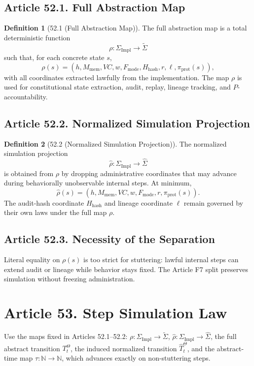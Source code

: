 \documentclass[10pt,oneside]{article}
\theoremstyle{definition}
\newtheorem*{definition}{Definition}
\theoremstyle{remark}
\newcommand{\N}{\mathbb{N}}
\newcommand{\Impl}{\mathrm{Impl}}
\newcommand{\prot}{\mathrm{prot}}
\newcommand{\mem}{\mathrm{mem}}
\newcommand{\hash}{\mathrm{hash}}
\newcommand{\mode}{\mathrm{mode}}
\begin{document}
\subsection{Article 52.1. Full Abstraction Map}
\begin{definition}[52.1 (Full Abstraction Map)]
The full abstraction map is a total deterministic function
\[
\rho:\Sigma_{\Impl}\to\widetilde{\Sigma}
\]
such that, for each concrete state \(s\),
\[
\rho(s)=(h,M_{\mem},VC,w,F_{\mode},H_{\hash},r,\ell,\pi_{\prot}(s)),
\]
with all coordinates extracted lawfully from the implementation. The map \(\rho\) is used for constitutional state extraction, audit, replay, lineage tracking, and \(P\)-accountability.
\end{definition}

\subsection{Article 52.2. Normalized Simulation Projection}
\begin{definition}[52.2 (Normalized Simulation Projection)]
The normalized simulation projection
\[
\widehat{\rho}:\Sigma_{\Impl}\to\widehat{\Sigma}
\]
is obtained from \(\rho\) by dropping administrative coordinates that may advance during behaviorally unobservable internal steps. At minimum,
\[
\widehat{\rho}(s)=(h,M_{\mem},VC,w,F_{\mode},r,\pi_{\prot}(s)).
\]
The audit-hash coordinate \(H_{\hash}\) and lineage coordinate \(\ell\) remain governed by their own laws under the full map \(\rho\).
\end{definition}

\subsection{Article 52.3. Necessity of the Separation}
Literal equality on \(\rho(s)\) is too strict for stuttering: lawful internal steps can extend audit or lineage while behavior stays fixed. The Article F7 split preserves simulation without freezing administration.

\section{Article 53. Step Simulation Law}
Use the maps fixed in Articles 52.1--52.2: \(\rho:\Sigma_{\Impl}\to\widetilde{\Sigma}\), \(\widehat\rho:\Sigma_{\Impl}\to\widehat\Sigma\), the full abstract transition \(T_t^\Theta\), the induced normalized transition \(\widehat T_t^\Theta\), and the abstract-time map \(\tau:\N\to\N\), which advances exactly on non-stuttering steps.
\end{document}
